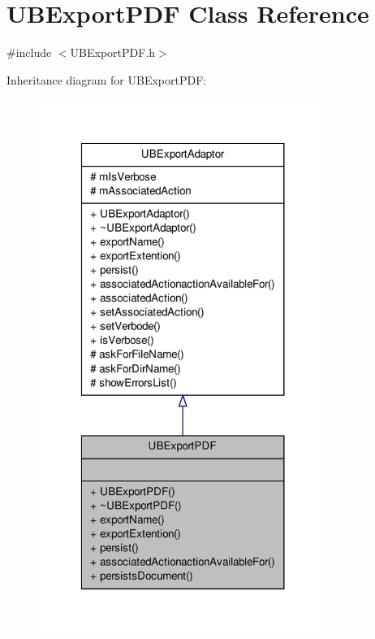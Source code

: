\hypertarget{class_u_b_export_p_d_f}{\section{U\-B\-Export\-P\-D\-F Class Reference}
\label{d8/df1/class_u_b_export_p_d_f}
}


{\ttfamily \#include $<$U\-B\-Export\-P\-D\-F.\-h$>$}



Inheritance diagram for U\-B\-Export\-P\-D\-F\-:
\nopagebreak
\begin{figure}[H]
\begin{center}
\leavevmode
\includegraphics[width=266pt]{df/d69/class_u_b_export_p_d_f__inherit__graph}
\end{center}
\end{figure}


